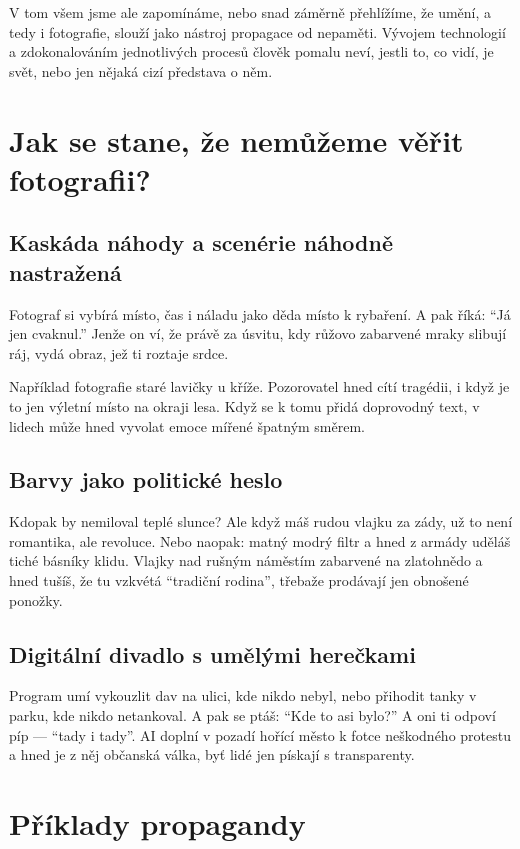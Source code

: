 \documentclass[12pt]{article} %
\begin{document}
V tom všem jsme ale zapomínáme, nebo snad záměrně přehlížíme, že umění, a tedy i fotografie, slouží jako nástroj 
propagace od nepaměti. Vývojem technologií a zdokonalováním jednotlivých procesů člověk pomalu neví, jestli to, co vidí, 
je svět, nebo jen nějaká cizí představa o něm.

\section{Jak se stane, že nemůžeme věřit fotografii?} 
\subsection{Kaskáda náhody a scenérie {náhodně} nastražená}
Fotograf si vybírá místo, čas i náladu jako děda místo k rybaření. A pak říká: \enquote{Já jen cvaknul.} Jenže on ví, že 
právě za úsvitu, kdy růžovo zabarvené mraky slibují ráj, vydá obraz, jež ti roztaje srdce.  

Například fotografie staré lavičky u kříže. Pozorovatel hned cítí tragédii, i když je to jen výletní místo na okraji 
lesa. Když se k tomu přidá doprovodný text, v lidech může hned vyvolat emoce mířené špatným směrem.

\subsection{Barvy jako politické heslo}
Kdopak by nemiloval teplé slunce? Ale když máš rudou vlajku za zády, už to není romantika, ale revoluce. Nebo naopak: 
matný modrý filtr a hned z armády uděláš tiché básníky klidu.  
Vlajky nad rušným náměstím zabarvené na zlatohnědo a hned tušíš, že tu vzkvétá \enquote{tradiční rodina}, třebaže
prodávají jen obnošené ponožky.

\subsection{Digitální divadlo s umělými herečkami}
Program umí vykouzlit dav na ulici, kde nikdo nebyl, nebo přihodit tanky v parku, kde nikdo netankoval. A pak se ptáš: 
\enquote{Kde to asi bylo?} A oni ti odpoví píp — \enquote{tady i tady}.  
AI doplní v pozadí hořící město k fotce neškodného protestu a hned je z něj občanská válka, byť lidé jen pískají s 
transparenty.

\section{Příklady propagandy}
\end{document}
